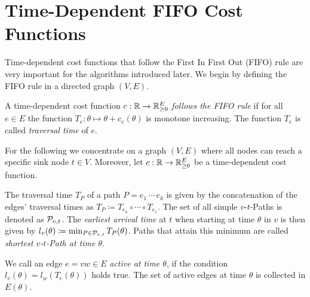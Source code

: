 \section{Time-Dependent FIFO Cost Functions}

Time-dependent cost functions that follow the First In First Out (FIFO) rule are very important for the algorithms introduced later.
We begin by defining the FIFO rule in a directed graph $(V, E)$.


\begin{definition}
    A time-dependent cost function $c: \mathbb{R}\rightarrow \mathbb{R}_{\geq0}^E$ \emph{follows the FIFO rule} if for all $e\in E$ the function $T_e: \theta\mapsto \theta + c_e(\theta)$ is monotone increasing.
    The function $T_e$ is called \emph{traversal time} of $e$.
\end{definition}

For the following we concentrate on a graph $(V,E)$ where all nodes can reach a specific sink node $t\in V$.
Moreover, let $c:\mathbb{R}\rightarrow \mathbb{R}_{\geq0}^E$ be a time-dependent cost function.

The traversal time $T_P$ of a path $P = e_1\,\cdots\,e_k$ is given by the concatenation of the edges' traversal times as $T_P \coloneqq T_{e_k} \circ \cdots \circ T_{e_1}$.
The set of all simple $v$-$t$-Paths is denoted as $\mathcal{P}_{v,t}$.
The \emph{earliest arrival time} at $t$ when starting at time $\theta$ in $v$ is then given by $l_v(\theta)\coloneqq \min_{P\in\mathcal{P}_{v,t}} T_P(\theta)$.
Paths that attain this minimum are called \emph{shortest $v$-$t$-Path at time $\theta$}.

We call an edge $e=vw\in E$ \emph{active at time $\theta$}, if the condition $l_v(\theta) = l_w(T_e(\theta))$ holds true.
The set of active edges at time $\theta$ is collected in $E(\theta)$.






